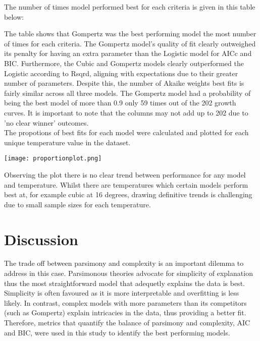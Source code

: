 \documentclass[11pt]{article}
\begin{document}
The number of times model performed best for each criteria is given in this table below: 
\begin{center}
\end{center}
The table shows that Gompertz was the best performing model the most number of times for each criteria. The Gompertz model's quality of fit clearly outweighed its penalty for having an extra parameter than the Logistic model for AICc and BIC. Furthermore, the Cubic and Gompertz models clearly outperformed the Logistic according to Rsqrd, aligning with expectations due to their greater number of parameters. Despite this, the number of Akaike weights best fits is fairly similar across all three models. The Gompertz model had a probability of being the best model of more than 0.9 only 59 times out of the 202 growth curves. It is important to note that the columns may not add up to 202 due to 'no clear winner' outcomes.\\

The propotions of best fits for each model were calculated and plotted for each unique temperature value in the dataset. 
  \begin{center}
    \texttt{[image: proportionplot.png]} 
  \end{center}
Observing the plot there is no clear trend between performance for any model and temperature. Whilst there are temperatures which certain models perform best at, for example cubic at 16 degrees, drawing definitive trends is challenging due to small sample sizes for each temperature.

\section{Discussion}

The trade off between parsimony and complexity is an important dilemma to address in this case. Parsimonous theories advocate for simplicity of explanation \cite{Coelho2019} thus the most straightforward model that adequetly explains the data is best. Simplicity is often favoured as it is more interpretable and overfitting is less likely. In contrast, complex models with more parameters than its competitors (such as Gompertz) explain intricacies in the data, thus providing a better fit. Therefore, metrics that quantify the balance of parsimony and complexity, AIC and BIC, were used in this study to identify the best performing models.\\
\end{document}
